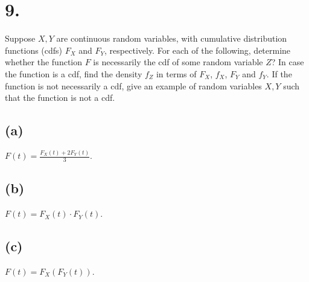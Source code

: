 \documentclass{article}
\begin{document}
\section*{9.}
{\Large 
Suppose $X,Y$ are continuous random variables, with cumulative distribution
functions (cdfs) $F_{X}$ and $F_{Y}$, respectively. For each of
the following, determine whether the function $F$ is necessarily
the cdf of some random variable $Z$? In case the function is a cdf,
find the density $f_{Z}$ in terms of $F_{X}$, $f_{X}$, $F_{Y}$
and $f_{Y}$. If the function is not necessarily a cdf, give an example
of random variables $X,Y$ such that the function is not a cdf. 

\subsection*{(a)}
$F\left(t\right)=\frac{F_{X}\left(t\right)+2F_{Y}\left(t\right)}{3}$.

\subsection*{(b)}
$F\left(t\right)=F_{X}\left(t\right)\cdot F_{Y}\left(t\right)$.

\subsection*{(c)}
$F\left(t\right)=F_{X}\left(F_{Y}\left(t\right)\right)$.


}
\end{document}
